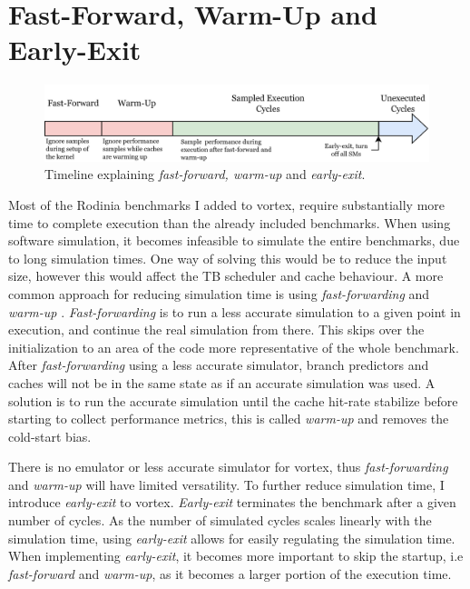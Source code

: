 \section{Fast-Forward, Warm-Up and Early-Exit} \label{sec:ff_wu_ee}

\begin{figure}
    \centering
    \includegraphics[width=\textwidth]{figures/fast-forward-timeline.png}
    \caption{Timeline explaining \textit{fast-forward, warm-up} and \textit{early-exit}.}
    \label{fig:ff-timeline}
\end{figure}

Most of the Rodinia benchmarks I added to \Gls{vortex}, require substantially more time to complete execution than the already included benchmarks. When using software simulation, it becomes infeasible to simulate the entire benchmarks, due to long simulation times. One way of solving this would be to reduce the input size, however this would affect the TB scheduler and cache behaviour. A more common approach for reducing simulation time is using \textit{fast-forwarding} and \textit{warm-up} \cite{simpoint}. \textit{Fast-forwarding} is to run a less accurate simulation to a given point in execution, and continue the real simulation from there. This skips over the initialization to an area of the code more representative of the whole benchmark. After \textit{fast-forwarding} using a less accurate simulator, branch predictors and caches will not be in the same state as if an accurate simulation was used. A solution is to run the accurate simulation until the cache hit-rate stabilize before starting to collect performance metrics, this is called \textit{warm-up} and removes the cold-start bias.

There is no emulator or less accurate simulator for \Gls{vortex}, thus \textit{fast-forwarding} and \textit{warm-up} will have limited versatility. To further reduce simulation time, I introduce \textit{early-exit} to \Gls{vortex}. \textit{Early-exit} terminates the benchmark after a given number of cycles. As the number of simulated cycles scales linearly with the simulation time, using \textit{early-exit} allows for easily regulating the simulation time. When implementing \textit{early-exit}, it becomes more important to skip the startup, i.e \textit{fast-forward} and \textit{warm-up}, as it becomes a larger portion of the execution time. 

